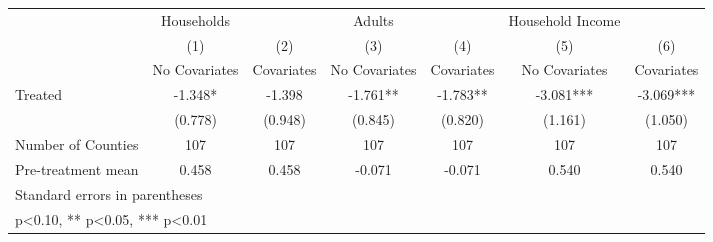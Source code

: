 {
\def\sym#1{\ifmmode^{#1}\else\(^{#1}\)\fi}
\begin{tabular}{l*{6}{c}}
\hline\hline
            &  Households   &               &      Adults   &               &Household Income   &               \\
            &\multicolumn{1}{c}{(1)}&\multicolumn{1}{c}{(2)}&\multicolumn{1}{c}{(3)}&\multicolumn{1}{c}{(4)}&\multicolumn{1}{c}{(5)}&\multicolumn{1}{c}{(6)}\\
            &\multicolumn{1}{c}{No Covariates}&\multicolumn{1}{c}{Covariates}&\multicolumn{1}{c}{No Covariates}&\multicolumn{1}{c}{Covariates}&\multicolumn{1}{c}{No Covariates}&\multicolumn{1}{c}{Covariates}\\
\hline
Treated     &      -1.348*  &      -1.398   &      -1.761** &      -1.783** &      -3.081***&      -3.069***\\
            &     (0.778)   &     (0.948)   &     (0.845)   &     (0.820)   &     (1.161)   &     (1.050)   \\
\hline
Number of Counties&         107   &         107   &         107   &         107   &         107   &         107   \\
Pre-treatment mean&       0.458   &       0.458   &      -0.071   &      -0.071   &       0.540   &       0.540   \\
\hline\hline
\multicolumn{7}{l}{\footnotesize Standard errors in parentheses}\\
\multicolumn{7}{l}{\footnotesize * p<0.10, ** p<0.05, *** p<0.01}\\
\end{tabular}
}
